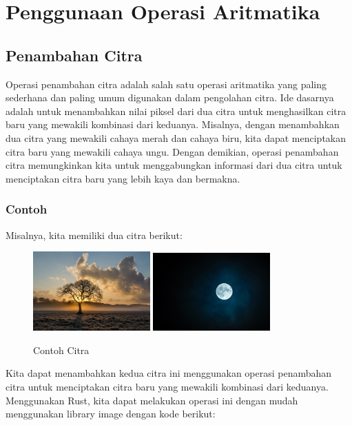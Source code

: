 \documentclass[a4paper,12pt,openany]{book}
\begin{document}
\section{Penggunaan Operasi Aritmatika}
\subsection{Penambahan Citra}
Operasi penambahan citra adalah salah satu operasi aritmatika yang paling sederhana dan paling umum digunakan dalam pengolahan citra. Ide dasarnya adalah untuk menambahkan nilai piksel dari dua citra untuk menghasilkan citra baru yang mewakili kombinasi dari keduanya. Misalnya, dengan menambahkan dua citra yang mewakili cahaya merah dan cahaya biru, kita dapat menciptakan citra baru yang mewakili cahaya ungu. Dengan demikian, operasi penambahan citra memungkinkan kita untuk menggabungkan informasi dari dua citra untuk menciptakan citra baru yang lebih kaya dan bermakna.

\subsubsection{Contoh}
Misalnya, kita memiliki dua citra berikut:


\begin{figure}[H]
    \centering
    \includegraphics[width=0.4\textwidth]{./image/arithmetic/lone-tree.jpg}
    \includegraphics[width=0.4\textwidth]{./image/arithmetic/moon.jpg}
    \caption{Contoh Citra}
\end{figure}

Kita dapat menambahkan kedua citra ini menggunakan operasi penambahan citra untuk menciptakan citra baru yang mewakili kombinasi dari keduanya. Menggunakan Rust, kita dapat melakukan operasi ini dengan mudah menggunakan library image dengan kode berikut:
\end{document}
